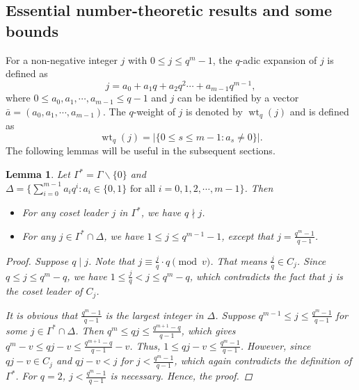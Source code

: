 \documentclass[pdflatex,sn-mathphys-num]{sn-jnl}%
\newtheorem{lemma}{Lemma}
\theoremstyle{thmstyleone}%
\theoremstyle{thmstyletwo}%
\theoremstyle{thmstylethree}%
\begin{document}
\subsection{Essential number-theoretic results and some bounds}
For a non-negative integer $j$ with $0\leq j\leq q^m-1$, the $q$-adic expansion of $j$ is defined as 
\begin{equation*}
    j= a_{0}+a_{1}q+a_{2}q^{2}\cdots+a_{m-1}q^{m-1},
\end{equation*}
where $0\leq a_{0},a_{1},\cdots,a_{m-1}\leq q-1$ and $j$ can be identified by a vector $\bar{a}=(a_{0},a_{1},\cdots,a_{m-1})$. The $q$-weight of $j$ is denoted by $\operatorname{wt}_{q}(j)$ and is defined as %
\begin{equation*}
    \operatorname{wt}_{q}(j)=|\{0\leq s\leq m-1: a_{s}\neq 0\}|.
\end{equation*}
The following lemmas will be useful in the subsequent sections.
\vspace{1em}
\begin{lemma}\label{L4}
   Let $\Gamma^{*}=\Gamma\backslash\{0\}$ and $\Delta=\{\sum_{i=0}^{m-1}a_{i}q^{i}:a_{i}\in\{0,1\}\text{ for all }i=0,1,2,\cdots,m-1\}$. Then
   \begin{itemize}
       \item For any coset leader $j$ in $\Gamma^{*}$, we have $q\nmid j$.
       \item For any $j\in\Gamma^{*}\cap\Delta$, we have $1\leq j\leq q^{m-1}-1$, except that $j=\frac{q^m-1}{q-1}$.
   \end{itemize}  
   \begin{proof}
       Suppose $q\mid j$. Note that $j\equiv \frac{j}{q}\cdot q\pmod{v}$. That means $\frac{j}{q}\in C_{j}$. Since $q\leq j\leq q^m-q$, we have $1\leq \frac{j}{q}<j\leq q^m-q$, which contradicts the fact that $j$ is the coset leader of $C_{j}$. 
       \par It is obvious that $\frac{q^m-1}{q-1}$ is the largest integer in $\Delta$. Suppose $q^{m-1}\leq j\leq \frac{q^m-1}{q-1}$ for some $j\in\Gamma^{*}\cap\Delta$. Then $q^m\leq qj\leq\frac{q^{m+1}-q}{q-1}$, which gives $q^m-v\leq qj-v\leq \frac{q^{m+1}-q}{q-1}-v$. Thus, $1\leq qj-v\leq \frac{q^m-1}{q-1}$. However, since $qj-v\in C_{j}$ and $qj-v<j$ for $j<\frac{q^m-1}{q-1}$, which again contradicts the definition of $\Gamma^{*}$. For $q=2$, $j<\frac{q^m-1}{q-1}$ is necessary. Hence, the proof.
   \end{proof}
\end{lemma}
\end{document}
